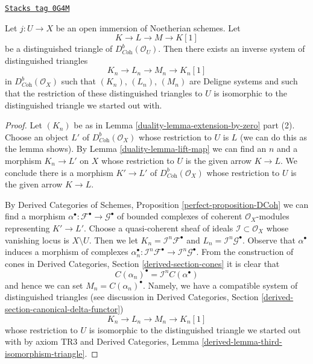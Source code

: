 \begin{lemma}
\label{duality-lemma-extension-by-zero-triangle}
\href{https://stacks.math.columbia.edu/tag/0G4M}{\texttt{Stacks tag 0G4M}}

Let $j : U \to X$ be an open immersion of Noetherian schemes. Let
$$
K \to L \to M \to K[1]
$$
be a distinguished triangle of $D^b_{\textit{Coh}}(\mathcal{O}_U)$.
Then there exists an inverse system of distinguished triangles
$$
K_n \to L_n \to M_n \to K_n[1]
$$
in $D^b_{\textit{Coh}}(\mathcal{O}_X)$ such that $(K_n)$, $(L_n)$, $(M_n)$
are Deligne systems and such that the restriction of these
distinguished triangles to $U$ is isomorphic to the distinguished triangle
we started out with.
\end{lemma}

\begin{proof}

Let $(K_n)$ be as in Lemma \ref{duality-lemma-extension-by-zero} part (2).
Choose an object $L'$ of $D^b_{\textit{Coh}}(\mathcal{O}_X)$
whose restriction to $U$ is $L$ (we can do this as the lemma shows).
By Lemma \ref{duality-lemma-lift-map} we can find an $n$ and a morphism
$K_n \to L'$ on $X$ whose restriction to $U$ is the given arrow
$K \to L$. We conclude there is a morphism $K' \to L'$ of
$D^b_{\textit{Coh}}(\mathcal{O}_X)$ whose restriction to $U$
is the given arrow $K \to L$.

\medskip\noindent
By Derived Categories of Schemes, Proposition \ref{perfect-proposition-DCoh}
we can find a morphism $\alpha^\bullet : \mathcal{F}^\bullet \to
\mathcal{G}^\bullet$ of bounded complexes
of coherent $\mathcal{O}_X$-modules representing $K' \to L'$.
Choose a quasi-coherent sheaf of ideals $\mathcal{I} \subset \mathcal{O}_X$
whose vanishing locus is $X \setminus U$.
Then we let
$K_n = \mathcal{I}^n\mathcal{F}^\bullet$
and
$L_n = \mathcal{I}^n\mathcal{G}^\bullet$.
Observe that $\alpha^\bullet$ induces a morphism of
complexes $\alpha_n^\bullet : \mathcal{I}^n\mathcal{F}^\bullet \to
\mathcal{I}^n\mathcal{G}^\bullet$. From the construction of cones in
Derived Categories, Section \ref{derived-section-cones}
it is clear that
$$
C(\alpha_n)^\bullet = \mathcal{I}^nC(\alpha^\bullet)
$$
and hence we can set $M_n = C(\alpha_n)^\bullet$. Namely, we
have a compatible system of distinguished triangles
(see discussion in Derived Categories, Section
\ref{derived-section-canonical-delta-functor})
$$
K_n \to L_n \to M_n \to K_n[1]
$$
whose restriction to $U$ is isomorphic to the distinguished
triangle we started out with by axiom TR3 and Derived Categories,
Lemma \ref{derived-lemma-third-isomorphism-triangle}.
\end{proof}

